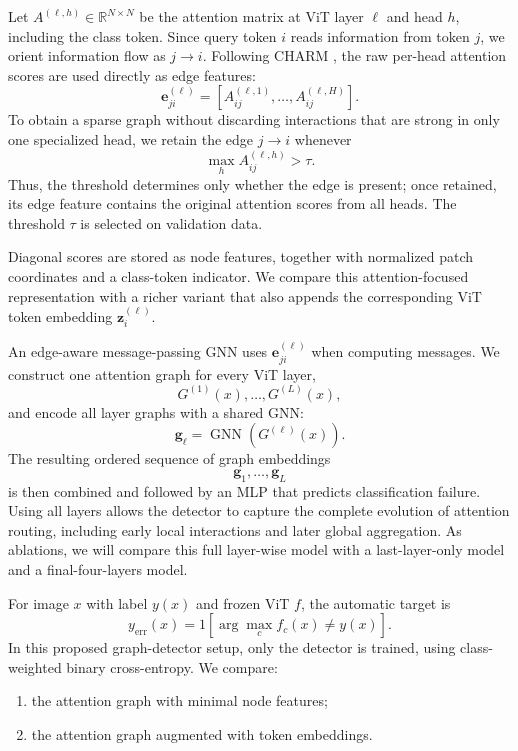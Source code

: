 Let $A^{(\ell,h)}\in\mathbb{R}^{N\times N}$ be the attention matrix at
ViT layer $\ell$ and head $h$, including the class token. Since query
token $i$ reads information from token $j$, we orient information flow as
$j\!\rightarrow\!i$. Following CHARM \citep{frasca2026charm}, the raw
per-head attention scores are used directly as edge features:
\[
\mathbf e_{ji}^{(\ell)}
=
\left[
A_{ij}^{(\ell,1)},\ldots,
A_{ij}^{(\ell,H)}
\right].
\]
To obtain a sparse graph without discarding interactions that are strong
in only one specialized head, we retain the edge $j\!\rightarrow\!i$
whenever
\[
\max_h A_{ij}^{(\ell,h)}>\tau.
\]
Thus, the threshold determines only whether the edge is present; once
retained, its edge feature contains the original attention scores from
all heads. The threshold $\tau$ is selected on validation data.

Diagonal scores are
stored as node features, together with normalized patch coordinates
and a class-token indicator. We compare this attention-focused
representation with a richer variant that also appends the
corresponding ViT token embedding $\mathbf z_i^{(\ell)}$.


An edge-aware message-passing GNN uses
$\mathbf e_{ji}^{(\ell)}$ when computing messages. We construct one
attention graph for every ViT layer,
\[
G^{(1)}(x),\ldots,G^{(L)}(x),
\]
and encode all layer graphs with a shared GNN:
\[
\mathbf g_\ell=\operatorname{GNN}\!\left(G^{(\ell)}(x)\right).
\]
The resulting ordered sequence of graph embeddings
\[
\mathbf g_1,\ldots,\mathbf g_L
\]
is then combined and followed by an MLP that predicts classification
failure. Using all layers allows the detector to capture the complete
evolution of attention routing, including early local interactions and
later global aggregation. As ablations, we
will compare this full layer-wise model with a last-layer-only model and a final-four-layers model.

For image $x$ with label $y(x)$ and frozen ViT $f$, the automatic
target is
\[
y_{\mathrm{err}}(x)
=
1\left[
\arg\max_c f_c(x)\neq y(x)
\right].
\]
In this proposed graph-detector setup, only the detector is trained, using class-weighted binary
cross-entropy. We compare:

\begin{enumerate}
    \item the attention graph with minimal node features;
    \item the attention graph augmented with token embeddings.
\end{enumerate}


